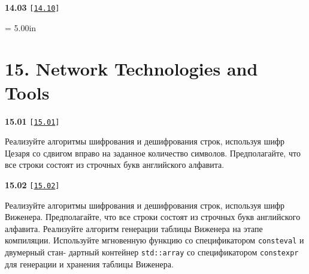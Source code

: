\documentclass[a4paper,12pt]{article}
\begin{document}
\bigskip

{\large \textbf{14.03} \texttt{[\href{https://github.com/i-s-m-mipt/Education/blob/master/projects/examples/source/14.10.cpp}{\texttt{14.10}}]}}

\bigskip





\newpage\thispagestyle{empty}\pdfpageheight = 5.00in\enlargethispage{100in}

\section{15. Network Technologies and Tools}

{\large \textbf{15.01} \texttt{[\href{https://github.com/i-s-m-mipt/Education/blob/master/projects/examples/source/15.01.cpp}{\texttt{15.01}}]}}

\bigskip

Реализуйте алгоритмы шифрования и дешифрования строк, используя шифр Цезаря со сдвигом вправо на заданное количество символов. Предполагайте, что все строки состоят из строчных букв английского алфавита.

\bigskip

{\large \textbf{15.02} \texttt{[\href{https://github.com/i-s-m-mipt/Education/blob/master/projects/examples/source/15.02.cpp}{\texttt{15.02}}]}}

\bigskip

Реализуйте алгоритмы шифрования и дешифрования строк, используя шифр Виженера. Предполагайте, что все строки состоят из строчных букв английского алфавита. Реализуйте алгоритм генерации таблицы Виженера на этапе компиляции. Используйте мгновенную функцию со спецификатором \lstinline{consteval} и двумерный стан- дартный контейнер \lstinline{std::array} со спецификатором \lstinline{constexpr} для генерации и хранения таблицы Виженера.  
\end{document}

